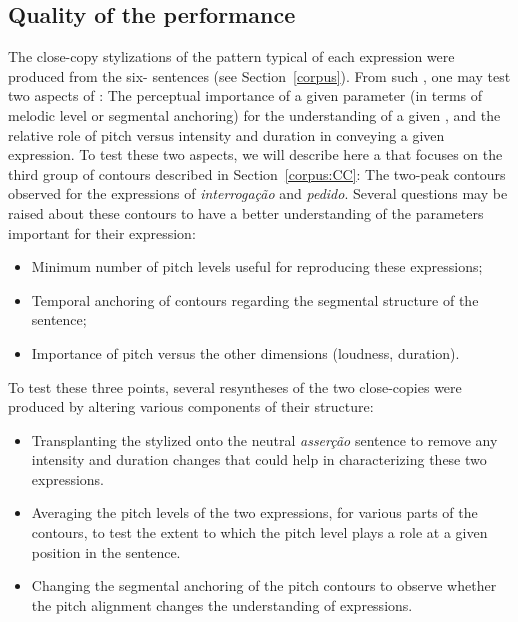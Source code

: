 \documentclass[output=paper]{LSP/langsci}
\begin{document}
\subsection{Quality of the performance}
\label{perception:performance}

The close-copy stylizations of the  pattern typical of each expression were produced from the six- sentences (see Section~\ref{corpus}). 
From such , one may test two aspects of : The perceptual importance of a given  parameter (in terms of melodic level or segmental anchoring) for the understanding of a given , and the relative role of pitch versus intensity and duration in conveying a given expression. 
To test these two aspects, we will describe here a  that focuses on the third group of  contours described in Section~\ref{corpus:CC}: The two-peak contours observed for the expressions of \textit{interrogação} and \textit{pedido}. 
Several questions may be raised about these contours to have a better understanding of the parameters important for their expression:
\begin{itemize}
\item Minimum number of pitch levels useful for reproducing these expressions;
\item Temporal anchoring of  contours regarding the segmental structure of the sentence;
\item Importance of pitch versus the other  dimensions (loudness, duration).
\end{itemize}

To test these three points, several resyntheses of the two close-copies were produced by altering various components of their structure:
\begin{itemize}
\item Transplanting the stylized  onto the neutral \textit{asserção} sentence to remove any intensity and duration changes that could help in characterizing these two expressions.
\item Averaging the pitch levels of the two expressions, for various parts of the contours, to test the extent to which the pitch level plays a role at a given position in the sentence.
\item Changing the segmental anchoring of the pitch contours to observe whether the pitch alignment changes the understanding of expressions.
\end{itemize}
\end{document}
